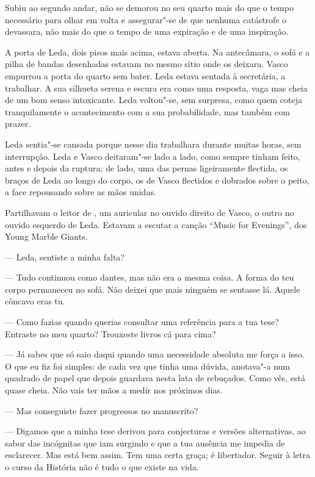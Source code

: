 Subiu ao segundo andar, não se demorou no seu quarto mais do que o tempo
necessário para olhar em volta e assegurar"-se de que nenhuma
catástrofe o devassara, não mais do que o tempo de uma expiração e de
uma inspiração.

A porta de Leda, dois pisos mais acima, estava aberta. Na antecâmara, o
sofá e a pilha de bandas desenhadas estavam no mesmo sítio onde os
deixara. Vasco empurrou a porta do quarto sem bater. Leda estava sentada
à secretária, a trabalhar. A sua silhueta serena e escura era como uma
resposta, vaga mas cheia de um bom senso intoxicante. Leda voltou"-se,
sem surpresa, como quem coteja tranquilamente o acontecimento com a sua
probabilidade, mas também com prazer.

Leda sentia"-se cansada porque nesse dia trabalhara durante muitas
horas, sem interrupção. Leda e Vasco deitaram"-se lado a lado, como
sempre tinham feito, antes e depois da ruptura: de lado, uma das pernas
ligeiramente flectida, os braços de Leda ao longo do corpo, os de Vasco
flectidos e dobrados sobre o peito, a face repousando sobre as mãos
unidas.

Partilhavam o leitor de , um auricular no ouvido direito de
Vasco, o outro no ouvido esquerdo de Leda. Estavam a escutar a canção
``Music for Evenings'', dos Young Marble Giants.

--- Leda, sentiste a minha falta?

--- Tudo continuou como dantes, mas não era a mesma coisa. A forma do teu
  corpo permaneceu no sofá. Não deixei que mais ninguém se sentasse lá.
  Aquele côncavo eras tu.

--- Como fazias quando querias consultar uma referência para a tua tese?
  Entraste no meu quarto? Trouxeste livros cá para cima?

--- Já sabes que só saio daqui quando uma necessidade absoluta me força a
  isso. O que eu fiz foi simples: de cada vez que tinha uma dúvida,
  anotava"-a num quadrado de papel que depois guardava nesta lata de
  rebuçados. Como vês, está quase cheia. Não vais ter mãos a medir nos
  próximos dias.

--- Mas conseguiste fazer progressos no manuscrito?

--- Digamos que a minha tese derivou para conjecturas e versões
  alternativas, ao sabor das incógnitas que iam surgindo e que a tua
  ausência me impedia de esclarecer. Mas está bem assim. Tem uma certa
  graça; é libertador. Seguir à letra o curso da História não é tudo o
  que existe na vida.

